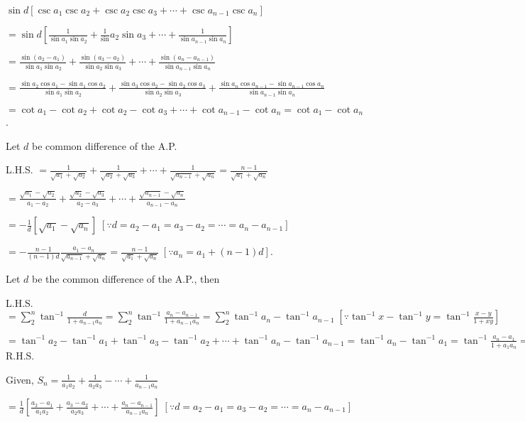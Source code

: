   $\sin d[\csc a_1\csc a_2 + \csc a_2\csc a_3 + \cdots + \csc a_{n - 1}\csc a_n]$

  $= \sin d\left[\frac{1}{\sin a_1\sin a_2} + \frac{1}\sin a_{2}\sin a_{3} + \cdots + \frac{1}{\sin a_{n - 1}\sin
    a_n}\right]$

  $= \frac{\sin(a_2 - a_1)}{\sin a_1\sin a_2} + \frac{\sin(a_3 - a_2)}{\sin a_2\sin a_3} + \cdots +
  \frac{\sin(a_n - a_{n - 1})}{\sin a_{n - 1}\sin a_n}$

  $= \frac{\sin a_2\cos a_1 - \sin a_1\cos a_2}{\sin a_1\sin a_2} + \frac{\sin a_3\cos a_2 - \sin a_2\cos
    a_3}{\sin a_2\sin a_3} + \frac{\sin a_n\cos a_{n - 1} - \sin a_{n - 1}\cos a_n}{\sin a_{n - 1}\sin a_n}$

  $= \cot a_1 - \cot a_2 + \cot a_2 - \cot a_3 + \cdots + \cot a_{n - 1} - \cot a_n = \cot a_1 - \cot a_n$.
\item Let $d$ be common difference of the A.P.

  L.H.S. $= \frac{1}{\sqrt{a_1} + \sqrt{a_2}} + \frac{1}{\sqrt{a_2} + \sqrt{a_3}} + \cdots +
  \frac{1}{\sqrt{a_{n - 1}} + \sqrt{a_n}} = \frac{n - 1}{\sqrt{a_1} + \sqrt{a_n}}$

  $= \frac{\sqrt{a_1} - \sqrt{a_2}}{a_1 - a_2} + \frac{\sqrt{a_2} - \sqrt{a_3}}{a_2 - a_3} + \cdots +
  \frac{\sqrt{a_{n - 1}} - \sqrt{a_n}}{a_{n - 1} - a_n}$

  $= -\frac{1}{d}[\sqrt{a_1} - \sqrt{a_n}]\;[\because d = a_2 - a_1 = a_3 - a_2 = \cdots = a_n - a_{n - 1}]$

  $= -\frac{n - 1}{(n - 1)d}\frac{a_1 - a_n}{\sqrt{a_{n - 1}} + \sqrt{a_n}} = \frac{n - 1}{\sqrt{a_1} +
    \sqrt{a_n}}\;[\because a_n = a_1 + (n - 1)d]$.
\item Let $d$ be the common difference of the A.P., then

  L.H.S. $= \displaystyle\sum_{2}^n\tan^{-1}\frac{d}{1 + a_{n - 1}a_n} = \sum_{2}^n\tan^{-1}\frac{a_n - a_{n
  - 1}}{1 + a_{n - 1}a_n} = \sum_{2}^n\tan^{-1}a_n - \tan^{-1}a_{n - 1}\;\left[\because \tan^{-1}x - \tan^{-1}y =
    \tan^{-1}\frac{x - y}{1 + xy}\right]$

  $= \tan^{-1}a_2 - \tan^{-1}a_1 + \tan^{-1}a_3 - \tan^{-1}a_2 + \cdots + \tan^{-1}a_n - \tan^{-1}a_{n - 1}
  = \tan^{-1}a_n - \tan^{-1}a_1 = \tan^{-1}\frac{a_n - a_1}{1 + a_1a_n} =$ R.H.S.
\item Given, $S_n = \frac{1}{a_1a_2} + \frac{1}{a_2a_3} - \cdots + \frac{1}{a_{n - 1}a_n}$

  $= \frac{1}{d}\left[\frac{a_2 - a_1}{a_1a_2} + \frac{a_3 - a_2}{a_2a_3} + \cdots + \frac{a_n - a_{n -
      1}}{a_{n - 1}a_{n}}\right]\;[\because d = a_2 - a_1 = a_3 - a_2 = \cdots = a_n - a_{n - 1}]$

